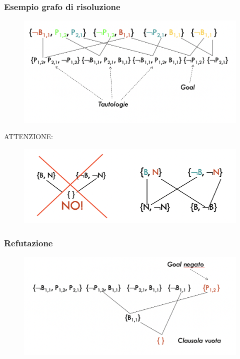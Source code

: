 \documentclass{article}
\begin{document}
\subsubsection{Esempio grafo di risoluzione}
\begin{figure}[h!]
\centering
\includegraphics[scale=0.5]{Images/esgraforisoluzione.png}
\end{figure}
ATTENZIONE:
\begin{figure}[h!]
\centering
\includegraphics[scale=0.5]{Images/danger.png}
\end{figure}
\subsubsection{Refutazione}
\begin{figure}[h!]
\centering
\includegraphics[scale=0.5]{Images/refutazione.png}
\end{figure}
\end{document}
